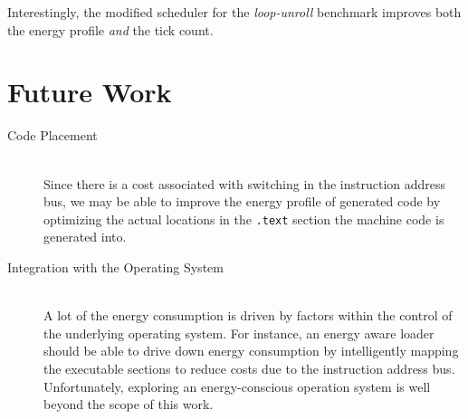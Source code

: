 Interestingly, the modified scheduler for the \textit{loop-unroll}
benchmark improves both the energy profile \textit{and} the tick
count.

\section{Future Work}

\begin{description}

\item[Code Placement] \hfill \\ Since there is a cost associated with
  switching in the instruction address bus, we may be able to improve
  the energy profile of generated code by optimizing the actual
  locations in the \texttt{.text} section the machine code is
  generated into.

\item[Integration with the Operating System] \hfill \\ A lot of the
  energy consumption is driven by factors within the control of the
  underlying operating system.  For instance, an energy aware loader
  should be able to drive down energy consumption by intelligently
  mapping the executable sections to reduce costs due to the
  instruction address bus.  Unfortunately, exploring an
  energy-conscious operation system is well beyond the scope of this
  work.

\end{description}
